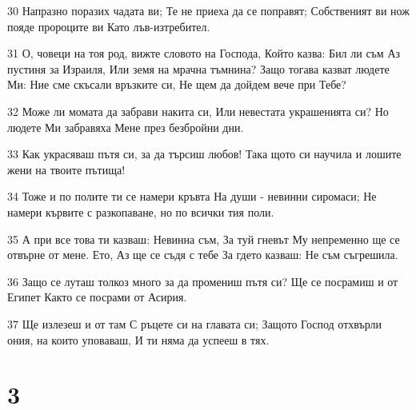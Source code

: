 \par 30 Напразно поразих чадата ви; Те не приеха да се поправят; Собственият ви нож пояде пророците ви Като лъв-изтребител.
\par 31 О, човеци на тоя род, вижте словото на Господа, Който казва: Бил ли съм Аз пустиня за Израиля, Или земя на мрачна тъмнина? Защо тогава казват людете Ми: Ние сме скъсали връзките си, Не щем да дойдем вече при Тебе?
\par 32 Може ли момата да забрави накита си, Или невестата украшенията си? Но людете Ми забравяха Мене през безбройни дни.
\par 33 Как украсяваш пътя си, за да търсиш любов! Така щото си научила и лошите жени на твоите пътища!
\par 34 Тоже и по полите ти се намери кръвта На души - невинни сиромаси; Не намери кървите с разкопаване, но по всички тия поли.
\par 35 А при все това ти казваш: Невинна съм, За туй гневът Му непременно ще се отвърне от мене. Ето, Аз ще се съдя с тебе За гдето казваш: Не съм съгрешила.
\par 36 Защо се луташ толкоз много за да промениш пътя си? Ще се посрамиш и от Египет Както се посрами от Асирия.
\par 37 Ще излезеш и от там С ръцете си на главата си; Защото Господ отхвърли ония, на които уповаваш, И ти няма да успееш в тях.

\chapter{3}

